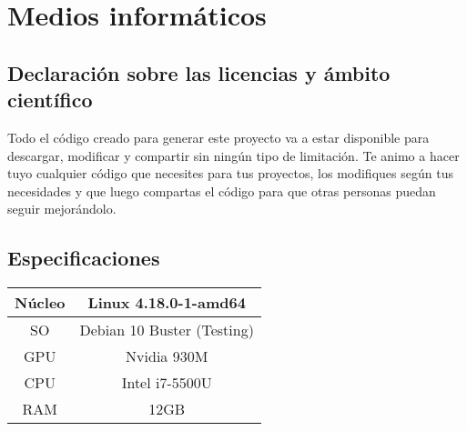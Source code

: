 \chapter*{Medios informáticos}
\section*{Declaración sobre las licencias y ámbito científico}

Todo el código creado para generar este proyecto va a estar disponible para descargar, modificar y compartir sin ningún tipo de limitación. Te animo a hacer tuyo cualquier código que necesites para tus proyectos, los modifiques según tus necesidades y que luego compartas el código para que otras personas puedan seguir mejorándolo.

\section*{Especificaciones}
\begin{table}[htbp]
	\centering %
	\begin{tabular}{|c|c|}
		
		\hline
		Núcleo & Linux 4.18.0-1-amd64 \\ \hline
		SO & Debian 10 Buster (Testing) \\ \hline
		GPU & Nvidia 930M \\ \hline
		CPU & Intel i7-5500U \\ \hline
		RAM & 12GB \\
		\hline
	\end{tabular}
	\label{tab:specs}
\end{table}